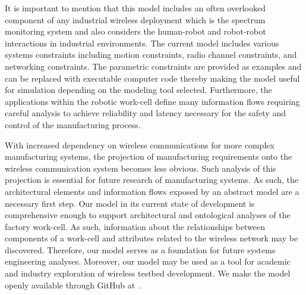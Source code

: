 It is important to mention that this model includes an often overlooked component of any industrial wireless deployment which is the spectrum monitoring system and also considers the human-robot and robot-robot interactions in industrial environments. The current model includes various systems constraints including motion constraints, radio channel constraints, and networking constraints. The parametric constraints are provided as examples and can be replaced with executable computer code thereby making the model useful for simulation depending on the modeling tool selected. Furthermore, the applications within the robotic work-cell define many information flows requiring careful analysis to achieve reliability and latency necessary for the safety and control of the manufacturing process.

With increased dependency on wireless communications for more complex manufacturing systems, the projection of manufacturing requirements onto the wireless communication system becomes less obvious. Such analysis of this projection is essential for future research of manufacturing systems. As such, the architectural elements and information flows exposed by an abstract model
are a necessary first step. Our model in its current state of development is comprehensive enough to support architectural and ontological analyses of the factory work-cell.  As such, information about the relationships between components of a work-cell and attributes related to the wireless network may be discovered. Therefore, our model serves as a foundation for future systems engineering analyses. Moreover, our model may be used as a tool for academic and industry exploration of wireless testbed development.  We make the model openly available through GitHub at~\cite{SysML.Candell2018}.

%
%
